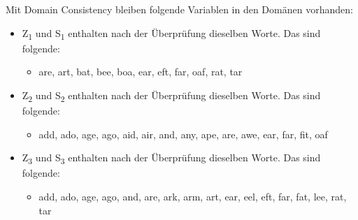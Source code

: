 \documentclass[ngerman]{fbi-aufgabenblatt}
\begin{document}
\newpage

Mit Domain Consistency bleiben folgende Variablen in den Domänen vorhanden:
\begin{itemize}
	\item Z\textsubscript{1} und S\textsubscript{1} enthalten nach der Überprüfung dieselben Worte. Das sind folgende:
	\begin{itemize}
		\item are, art, bat, bee, boa, ear, eft, far, oaf, rat, tar
	\end{itemize}
	\item Z\textsubscript{2} und S\textsubscript{2} enthalten nach der Überprüfung dieselben Worte. Das sind folgende:
	\begin{itemize}
		\item add, ado, age, ago, aid, air, and, any, ape, are, awe, ear, far, fit, oaf
	\end{itemize}
	\item Z\textsubscript{3} und S\textsubscript{3} enthalten nach der Überprüfung dieselben Worte. Das sind folgende:
	\begin{itemize}
		\item add, ado, age, ago, and, are, ark, arm, art, ear, eel, eft, far, fat, lee, rat, tar \\
	\end{itemize}
\end{itemize}
\end{document}
